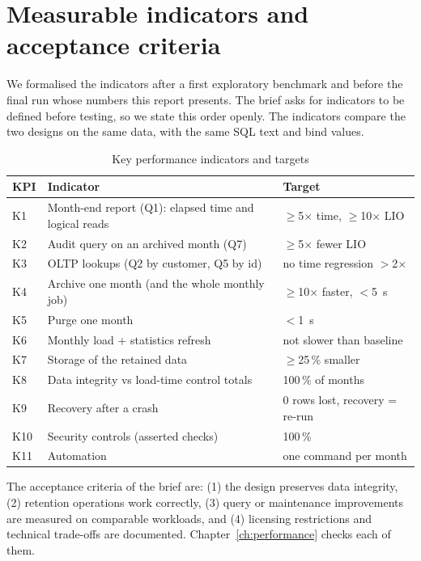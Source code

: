 \section{Measurable indicators and acceptance criteria}

We formalised the indicators after a first exploratory benchmark and before the final run
whose numbers this report presents. The brief asks for indicators to be defined before
testing, so we state this order openly. The indicators compare the two designs on the same
data, with the same SQL text and bind values.

\begin{table}[H]
\centering
\caption{Key performance indicators and targets}
\label{tab:kpi}
\begin{tabularx}{\linewidth}{lXl}
\toprule
KPI & Indicator & Target \\
\midrule
K1 & Month-end report (Q1): elapsed time and logical reads & $\geq$5$\times$ time, $\geq$10$\times$ LIO \\
K2 & Audit query on an archived month (Q7) & $\geq$5$\times$ fewer LIO \\
K3 & OLTP lookups (Q2 by customer, Q5 by id) & no time regression $>$2$\times$ \\
K4 & Archive one month (and the whole monthly job) & $\geq$10$\times$ faster, $<$5~s \\
K5 & Purge one month & $<$1~s \\
K6 & Monthly load + statistics refresh & not slower than baseline \\
K7 & Storage of the retained data & $\geq$25\,\% smaller \\
K8 & Data integrity vs load-time control totals & 100\,\% of months \\
K9 & Recovery after a crash & 0 rows lost, recovery = re-run \\
K10 & Security controls (asserted checks) & 100\,\% \\
K11 & Automation & one command per month \\
\bottomrule
\end{tabularx}
\end{table}

The acceptance criteria of the brief are: (1) the design preserves data integrity,
(2) retention operations work correctly, (3) query or maintenance improvements are measured
on comparable workloads, and (4) licensing restrictions and technical trade-offs are
documented. Chapter~\ref{ch:performance} checks each of them.
